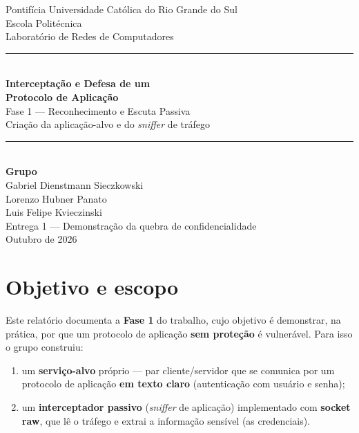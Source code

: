 \documentclass[11pt,a4paper]{article}
\begin{document}
\begin{titlepage}
\centering
\vspace*{1.5cm}
{\large Pontifícia Universidade Católica do Rio Grande do Sul}\\[0.2cm]
{\large Escola Politécnica}\\[0.2cm]
{\large Laboratório de Redes de Computadores}\\[2.5cm]

\rule{\linewidth}{0.5mm}\\[0.5cm]
{\huge \bfseries Interceptação e Defesa de um\\ Protocolo de Aplicação}\\[0.4cm]
{\Large Fase 1 — Reconhecimento e Escuta Passiva}\\[0.3cm]
{\large Criação da aplicação-alvo e do \textit{sniffer} de tráfego}\\
\rule{\linewidth}{0.5mm}\\[1.5cm]

{\large\bfseries Grupo}\\[0.3cm]
{\large
Gabriel Dienstmann Sieczkowski\\
Lorenzo Hubner Panato\\
Luis Felipe Kvieczinski\\
}
\vfill
{\large Entrega 1 — Demonstração da quebra de confidencialidade}\\[0.3cm]
{\large Outubro de 2026}
\end{titlepage}

\tableofcontents
\newpage

\section{Objetivo e escopo}

Este relatório documenta a \textbf{Fase 1} do trabalho, cujo objetivo é
demonstrar, na prática, por que um protocolo de aplicação \textbf{sem proteção}
é vulnerável. Para isso o grupo construiu:

\begin{enumerate}[nosep]
  \item um \textbf{serviço-alvo} próprio — par cliente/servidor que se comunica
        por um protocolo de aplicação \textbf{em texto claro} (autenticação com
        usuário e senha);
  \item um \textbf{interceptador passivo} (\textit{sniffer} de aplicação)
        implementado com \textbf{socket raw}, que lê o tráfego e extrai a
        informação sensível (as credenciais).
\end{enumerate}
\end{document}
